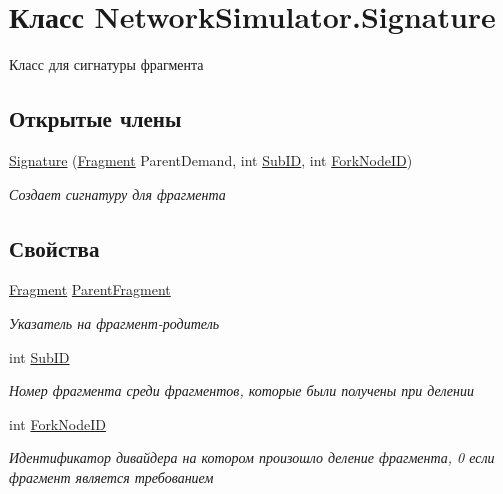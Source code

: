 \hypertarget{class_network_simulator_1_1_signature}{}\section{Класс Network\+Simulator.\+Signature}
\label{class_network_simulator_1_1_signature}


Класс для сигнатуры фрагмента  


\subsection*{Открытые члены}
\begin{DoxyCompactItemize}
\item 
\hyperlink{class_network_simulator_1_1_signature_ae80636e822b8a99c622db6f0941a64e3}{Signature} (\hyperlink{class_network_simulator_1_1_fragment}{Fragment} Parent\+Demand, int \hyperlink{class_network_simulator_1_1_signature_ab571d5b84e1f7866a6ab6f6d79bc86d9}{Sub\+ID}, int \hyperlink{class_network_simulator_1_1_signature_ad1296ff97d325ac85896bf9a1d4d5247}{Fork\+Node\+ID})
\begin{DoxyCompactList}\small\item\em Создает сигнатуру для фрагмента \end{DoxyCompactList}\end{DoxyCompactItemize}
\subsection*{Свойства}
\begin{DoxyCompactItemize}
\item 
\hyperlink{class_network_simulator_1_1_fragment}{Fragment} \hyperlink{class_network_simulator_1_1_signature_ac9b2e402433d945c4fa8a7722bfe9ecc}{Parent\+Fragment}
\begin{DoxyCompactList}\small\item\em Указатель на фрагмент-\/родитель \end{DoxyCompactList}\item 
int \hyperlink{class_network_simulator_1_1_signature_ab571d5b84e1f7866a6ab6f6d79bc86d9}{Sub\+ID}
\begin{DoxyCompactList}\small\item\em Номер фрагмента среди фрагментов, которые были получены при делении \end{DoxyCompactList}\item 
int \hyperlink{class_network_simulator_1_1_signature_ad1296ff97d325ac85896bf9a1d4d5247}{Fork\+Node\+ID}
\begin{DoxyCompactList}\small\item\em Идентификатор дивайдера на котором произошло деление фрагмента, 0 если фрагмент является требованием \end{DoxyCompactList}\end{DoxyCompactItemize}


